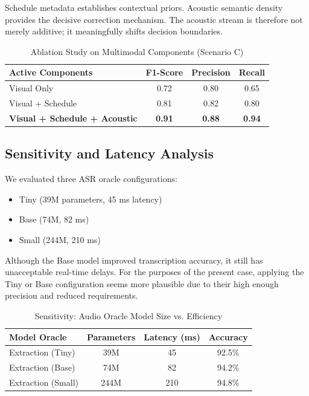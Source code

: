 \documentclass[conference]{IEEEtran}
\begin{document}
Schedule metadata establishes contextual priors. Acoustic semantic density provides the decisive correction mechanism. The acoustic stream is therefore not merely additive; it meaningfully shifts decision boundaries.

\begin{table}[htbp]
\caption{Ablation Study on Multimodal Components (Scenario C)}
\begin{center}
\begin{tabular}{lccc}
\toprule
\textbf{Active Components} & \textbf{F1-Score} & \textbf{Precision} & \textbf{Recall} \\
\midrule
Visual Only & 0.72 & 0.80 & 0.65 \\
Visual + Schedule & 0.81 & 0.82 & 0.80 \\
\textbf{Visual + Schedule + Acoustic} & \textbf{0.91} & \textbf{0.88} & \textbf{0.94} \\
\bottomrule
\end{tabular}
\end{center}
\end{table}

\subsection{Sensitivity and Latency Analysis}
We evaluated three ASR oracle configurations:
\begin{itemize}
    \item Tiny (39M parameters, 45 ms latency)
    \item Base (74M, 82 ms)
    \item Small (244M, 210 ms)
\end{itemize}

Although the Base model improved transcription accuracy, it still has unacceptable real-time delays. For the purposes of the present case, applying the Tiny or Base configuration seems more plausible due to their high enough precision and reduced requirements.

\begin{table}[htbp]
\caption{Sensitivity: Audio Oracle Model Size vs. Efficiency}
\begin{center}
\begin{tabular}{lccc}
\toprule
\textbf{Model Oracle} & \textbf{Parameters} & \textbf{Latency (ms)} & \textbf{Accuracy} \\
\midrule
Extraction (Tiny) & 39M & 45 & 92.5\% \\
Extraction (Base) & 74M & 82 & 94.2\% \\
Extraction (Small) & 244M & 210 & 94.8\% \\
\bottomrule
\end{tabular}
\end{center}
\end{table}
\end{document}
